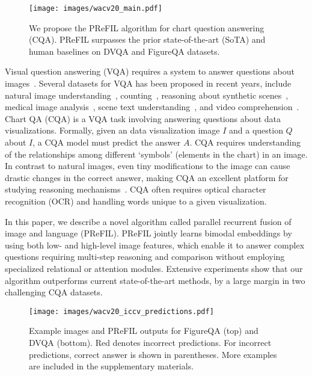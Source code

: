 \documentclass[10pt,twocolumn]{article}
\begin{document}
\begin{figure}[t]
    \centering
    \texttt{[image: images/wacv20\_main.pdf]}
    \caption{We propose the PReFIL algorithm for chart question answering (CQA). PReFIL surpasses the prior state-of-the-art (SoTA) and human baselines on DVQA and FigureQA datasets.}
    \label{fig:overview}
\end{figure}

Visual question answering (VQA) requires a system to answer questions about images~\cite{antol2015vqa,malinowski2014multi,kafle2016review,kafle2017data}. Several datasets for VQA has been proposed in recent years, include natural image understanding~\cite{malinowski2014multi,antol2015vqa}, counting~\cite{acharya2019tallyqa}, reasoning about synthetic scenes~\cite{johnson2016clevr}, medical image analysis~\cite{lau2018dataset}, scene text understanding~\cite{Singh2019TowardsVM}, and video comprehension~\cite{jang2017tgif}. Chart QA (CQA) is a VQA task involving answering questions about data visualizations. Formally, given an data visualization image $I$ and a question $Q$ about $I$, a CQA model must predict the answer $A$. CQA requires understanding of the relationships among  different `symbols' (elements in the chart) in an image. In contrast to natural images, even tiny modifications to the image can cause drastic changes in the correct answer, making CQA an excellent platform for studying reasoning mechanisms~\cite{figureqa,kafle2018dvqa}. CQA often requires optical character recognition (OCR) and handling words unique to a given visualization.

In this paper, we describe a novel algorithm called parallel recurrent fusion of image and language (PReFIL). PReFIL jointly learns bimodal embeddings by using both low- and high-level image features, which enable it to answer complex questions requiring multi-step reasoning and comparison without employing specialized relational or attention modules. Extensive experiments show that our algorithm outperforms current state-of-the-art methods, by a large margin in two challenging CQA datasets.

\vspace{1cm}

\begin{figure*}[t!]
    \centering
    \texttt{[image: images/wacv20\_iccv\_predictions.pdf]}
    \caption{Example images and PReFIL outputs for FigureQA (top) and DVQA (bottom). Red denotes incorrect predictions. For incorrect predictions, correct answer is shown in parentheses. More examples are included in the supplementary materials. \label{fig:dvqa-examples}}
\end{figure*}
\end{document}
